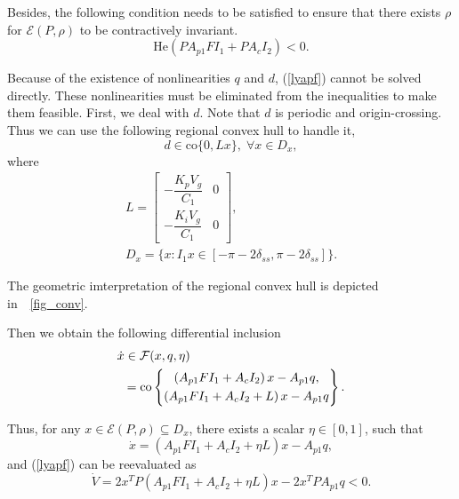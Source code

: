 \documentclass[10pt,final,journal,twoside]{IEEEtran}
\begin{document}
Besides, the following condition needs to be satisfied to ensure that there exists $\rho$ for $\mathcal{E}(P,\rho)$ to be contractively invariant.
\begin{equation}\label{olcond}\mathrm{He}\left(PA_{p1}FI_1+PA_cI_2\right)<0.\end{equation}

Because of the existence of nonlinearities $q$ and $d$, (\ref{lyapf}) cannot be solved directly. These nonlinearities must be eliminated from the inequalities to make them feasible.
First, we deal with $d$. Note that $d$ is periodic and origin-crossing. Thus we can use the following regional convex hull to handle it,%
\begin{equation}\label{localch}
    d\in\mathrm{co}\{0,Lx\},\;\forall x\in D_x,
\end{equation}
where
\begin{gather*}
L=\begin{bmatrix}
    -\dfrac{K_pV_g}{C_1}&0\\-\dfrac{K_iV_g}{C_1}&0
\end{bmatrix},\\
D_x=\{x:I_1x\in[-\pi-2\delta_{ss},\pi-2\delta_{ss}]\}.
\end{gather*}\par
The geometric imterpretation of the regional convex hull is depicted in~\figurename~\ref{fig_conv}.\par
Then we obtain the following differential inclusion
\begin{align}\label{diffinclu}
    &\dot{x}\in\mathcal{F}(x,q,\eta)\\
    &\;\:=\mathrm{co}\left\{\begin{gathered}\left(A_{p1}FI_1+A_cI_2\right)x-A_{p1}q ,\\
    \left(A_{p1}FI_1+A_cI_2+L\right)x-A_{p1}q\end{gathered}\right\}.\notag
\end{align}\par
Thus, for any $x\in\mathcal{E}(P,\rho)\subseteq D_x$, there exists a scalar $\eta\in[0,1]$, such that
\begin{equation}
\dot{x}=\left(A_{p1}FI_1+A_cI_2+\eta L\right)x-A_{p1}q,
\end{equation}
and (\ref{lyapf}) can be reevaluated as
\begin{equation}\label{convhlyapf}
    \dot{V}=2x^TP\left(A_{p1}FI_1+A_cI_2+\eta L\right)x-2x^TPA_{p1}q<0.
\end{equation}\par
\end{document}
